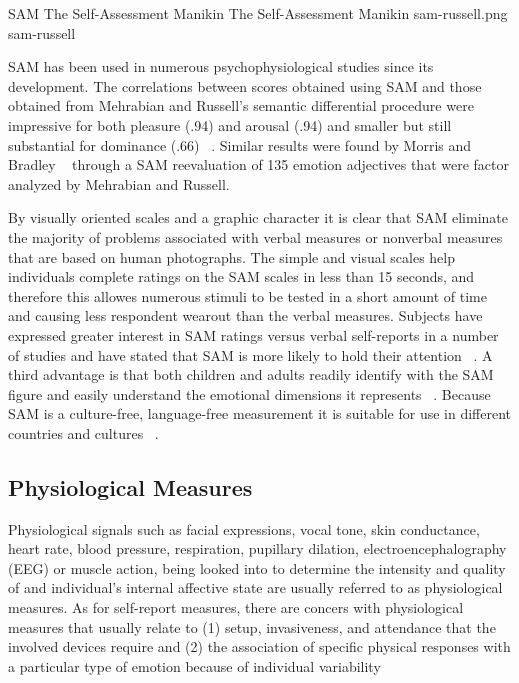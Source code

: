 \img
{SAM The Self-Assessment Manikin}
{The Self-Assessment Manikin}
{sam-russell.png}
{sam-russell}

SAM has been used in numerous psychophysiological studies since its development. The correlations between scores obtained using SAM and those obtained from Mehrabian and Russell's semantic differential procedure were impressive for both pleasure (.94) and arousal (.94) and smaller but still substantial for dominance (.66) ~\cite{lang1985cognitive}. Similar results were found by Morris and Bradley ~\cite{morris1995observations} through a SAM reevaluation of 135 emotion adjectives that were factor analyzed by Mehrabian and Russell.

By visually oriented scales and a graphic character it is clear that SAM eliminate the majority of problems associated with verbal measures or nonverbal measures that are based on human photographs. The simple and visual scales help individuals complete ratings on the SAM scales in less than 15 seconds, and therefore this allowes numerous stimuli to be tested in a short amount of time and causing less respondent wearout than the verbal measures. Subjects have expressed greater interest in SAM ratings versus verbal self-reports in a number of studies and have stated that SAM is more likely to hold their attention ~\cite{lang1985cognitive}. A third advantage is that both children and adults readily identify with the SAM figure and easily understand the emotional dimensions it represents ~\cite{lang1985cognitive}. Because SAM is a culture-free, language-free measurement it is suitable for use in different countries and cultures ~\cite{bradley1993affective}.


\subsection{Physiological Measures}

Physiological signals such as facial expressions, vocal tone, skin conductance, heart rate, blood pressure, respiration, pupillary dilation, electroencephalography (EEG) or muscle action, being looked into to determine the intensity and quality of and individual's internal affective state are usually referred to as physiological measures. As for self-report measures, there are concers with physiological measures that usually relate to (1) setup, invasiveness, and attendance that the involved devices require and (2) the association of specific physical responses with a particular type of emotion because of individual variability ~\cite{depaula2005cognitive}

